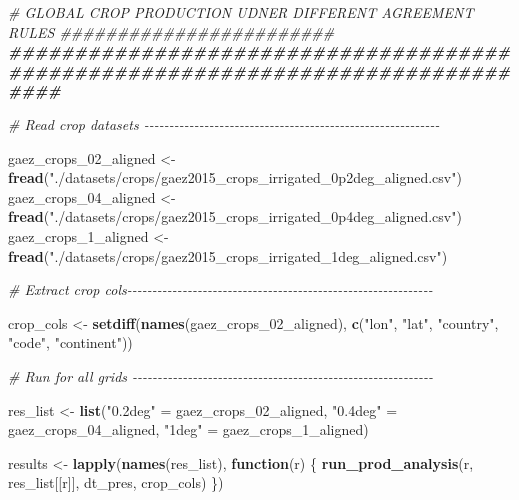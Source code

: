 \documentclass[
  11pt,
]{article}
\newenvironment{Shaded}{\begin{snugshade}}{\end{snugshade}}
\newcommand{\CommentTok}[1]{\textcolor[rgb]{0.56,0.35,0.01}{\textit{#1}}}
\newcommand{\ControlFlowTok}[1]{\textcolor[rgb]{0.13,0.29,0.53}{\textbf{#1}}}
\newcommand{\DocumentationTok}[1]{\textcolor[rgb]{0.56,0.35,0.01}{\textbf{\textit{#1}}}}
\newcommand{\FunctionTok}[1]{\textcolor[rgb]{0.13,0.29,0.53}{\textbf{#1}}}
\newcommand{\NormalTok}[1]{#1}
\newcommand{\OtherTok}[1]{\textcolor[rgb]{0.56,0.35,0.01}{#1}}
\newcommand{\StringTok}[1]{\textcolor[rgb]{0.31,0.60,0.02}{#1}}
\begin{document}
\begin{Shaded}
\begin{Highlighting}[]
\CommentTok{\# GLOBAL CROP PRODUCTION UDNER DIFFERENT AGREEMENT RULES \#\#\#\#\#\#\#\#\#\#\#\#\#\#\#\#\#\#\#\#\#\#\#\#}
\DocumentationTok{\#\#\#\#\#\#\#\#\#\#\#\#\#\#\#\#\#\#\#\#\#\#\#\#\#\#\#\#\#\#\#\#\#\#\#\#\#\#\#\#\#\#\#\#\#\#\#\#\#\#\#\#\#\#\#\#\#\#\#\#\#\#\#\#\#\#\#\#\#\#\#\#\#\#\#\#\#\#\#\#}

\CommentTok{\# Read crop datasets {-}{-}{-}{-}{-}{-}{-}{-}{-}{-}{-}{-}{-}{-}{-}{-}{-}{-}{-}{-}{-}{-}{-}{-}{-}{-}{-}{-}{-}{-}{-}{-}{-}{-}{-}{-}{-}{-}{-}{-}{-}{-}{-}{-}{-}{-}{-}{-}{-}{-}{-}{-}{-}{-}{-}{-}{-}{-}{-}}

\NormalTok{gaez\_crops\_02\_aligned }\OtherTok{\textless{}{-}} \FunctionTok{fread}\NormalTok{(}\StringTok{"./datasets/crops/gaez2015\_crops\_irrigated\_0p2deg\_aligned.csv"}\NormalTok{)}
\NormalTok{gaez\_crops\_04\_aligned }\OtherTok{\textless{}{-}} \FunctionTok{fread}\NormalTok{(}\StringTok{"./datasets/crops/gaez2015\_crops\_irrigated\_0p4deg\_aligned.csv"}\NormalTok{)}
\NormalTok{gaez\_crops\_1\_aligned }\OtherTok{\textless{}{-}} \FunctionTok{fread}\NormalTok{(}\StringTok{"./datasets/crops/gaez2015\_crops\_irrigated\_1deg\_aligned.csv"}\NormalTok{)}

\CommentTok{\# Extract crop cols{-}{-}{-}{-}{-}{-}{-}{-}{-}{-}{-}{-}{-}{-}{-}{-}{-}{-}{-}{-}{-}{-}{-}{-}{-}{-}{-}{-}{-}{-}{-}{-}{-}{-}{-}{-}{-}{-}{-}{-}{-}{-}{-}{-}{-}{-}{-}{-}{-}{-}{-}{-}{-}{-}{-}{-}{-}{-}{-}{-}{-}}

\NormalTok{crop\_cols }\OtherTok{\textless{}{-}} \FunctionTok{setdiff}\NormalTok{(}\FunctionTok{names}\NormalTok{(gaez\_crops\_02\_aligned),   }
                     \FunctionTok{c}\NormalTok{(}\StringTok{"lon"}\NormalTok{, }\StringTok{"lat"}\NormalTok{, }\StringTok{"country"}\NormalTok{, }\StringTok{"code"}\NormalTok{, }\StringTok{"continent"}\NormalTok{))}

\CommentTok{\# Run for all grids {-}{-}{-}{-}{-}{-}{-}{-}{-}{-}{-}{-}{-}{-}{-}{-}{-}{-}{-}{-}{-}{-}{-}{-}{-}{-}{-}{-}{-}{-}{-}{-}{-}{-}{-}{-}{-}{-}{-}{-}{-}{-}{-}{-}{-}{-}{-}{-}{-}{-}{-}{-}{-}{-}{-}{-}{-}{-}{-}{-}}

\NormalTok{res\_list }\OtherTok{\textless{}{-}} \FunctionTok{list}\NormalTok{(}\StringTok{"0.2deg"} \OtherTok{=}\NormalTok{ gaez\_crops\_02\_aligned,}
                 \StringTok{"0.4deg"} \OtherTok{=}\NormalTok{ gaez\_crops\_04\_aligned,}
                 \StringTok{"1deg"}   \OtherTok{=}\NormalTok{ gaez\_crops\_1\_aligned)}

\NormalTok{results }\OtherTok{\textless{}{-}} \FunctionTok{lapply}\NormalTok{(}\FunctionTok{names}\NormalTok{(res\_list), }\ControlFlowTok{function}\NormalTok{(r) \{}
  \FunctionTok{run\_prod\_analysis}\NormalTok{(r, res\_list[[r]], dt\_pres, crop\_cols)}
\NormalTok{\})}
\end{Highlighting}
\end{Shaded}
\end{document}
